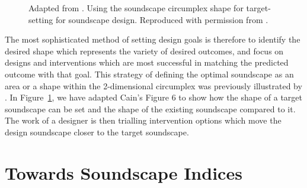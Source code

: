 \documentclass[
  authoryear,
  preprint,
  1p]{elsarticle}
\begin{document}
\begin{figure}


\caption{\label{fig-cain}Adapted from \citet{Cain2013development}. Using
the soundscape circumplex shape for target-setting for soundscape
design. Reproduced with permission from \citet{Mitchell2022Predictive}.}

\end{figure}%

The most sophisticated method of setting design goals is therefore to
identify the desired shape which represents the variety of desired
outcomes, and focus on designs and interventions which are most
successful in matching the predicted outcome with that goal. This
strategy of defining the optimal soundscape as an area or a shape within
the 2-dimensional circumplex was previously illustrated by
\citet{Cain2013development}. In Figure~\ref{fig-cain}, we have adapted
Cain's Figure 6 to show how the shape of a target soundscape can be set
and the shape of the existing soundscape compared to it. The work of a
designer is then trialling intervention options which move the design
soundscape closer to the target soundscape.

\section{Towards Soundscape Indices}\label{towards-soundscape-indices}
\end{document}
